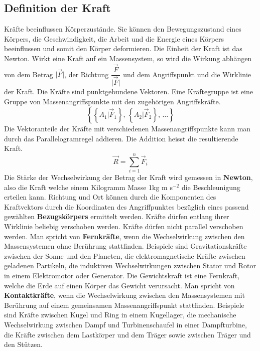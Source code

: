 \subsection{Definition der Kraft}
Kräfte beeinflussen Körperzustände. Sie können den Bewegungszustand eines Körpers, die Geschwindigkeit, die Arbeit und die Energie eines Körpers beeinflussen und somit den Körper deformieren. Die Einheit der Kraft ist das Newton.
\newline\newline
Wirkt eine Kraft auf ein Massensystem, so wird die Wirkung abhängen von dem Betrag $\Big\vert \overrightarrow{F}\Big\vert$, der Richtung $\dfrac{\overrightarrow{F}}{\Big\vert\overrightarrow{F}\Big\vert}$ und dem Angriffspunkt und die Wirklinie der Kraft. Die Kräfte sind punktgebundene Vektoren. Eine Kräftegruppe ist eine Gruppe von Massenangriffspunkte mit den zugehörigen Angriffskräfte.
\begin{equation}
\boxed{\left\{\left\{A_1 | \overrightarrow{F}_1\right\}, \,\left\{A_2 | \overrightarrow{F}_2\right\},\,\dotso\right\}}
\end{equation}
Die Vektoranteile der Kräfte mit verschiedenen Massenangriffspunkte kann man durch das Parallelogramregel addieren. Die Addition heisst die resultierende Kraft.
\begin{equation}
\boxed{\overrightarrow{R}=\displaystyle \sum_{i=1}^n\overrightarrow{F}_i}
\end{equation}
Die Stärke der Wechselwirkung der Betrag der Kraft wird gemessen in \textbf{Newton}, also die Kraft welche einem Kilogramm Masse 1kg m s$^{-2}$ die Beschleunigung erteilen kann. Richtung und Ort können durch die Komponenten des Kraftvektors durch die Koordinaten des Angriffpunktes bezüglich eines passend gewählten \textbf{Bezugskörpers} ermittelt werden.
\newline\newline
Kräfte dürfen entlang ihrer Wirklinie beliebig verschoben werden. Kräfte dürfen nicht parallel verschoben werden. 
\newline\newline
Man spricht von \textbf{Fernkräfte}, wenn die Wechselwirkung zwischen den Massensystemen ohne Berührung stattfinden. Beispiele sind Gravitationskräfte zwischen der Sonne und den Planeten, die elektromagnetische Kräfte zwischen geladenen Partikeln, die induktiven Wechselwirkungen zwischen Stator und Rotor in einem Elektromotor oder Generator. Die Gewichtskraft ist eine Fernkraft, welche die Erde auf einen Körper das Gewicht verursacht.
\newline\newline
Man spricht von \textbf{Kontaktkräfte}, wenn die Wechselwirkung zwischen den Massensystemen mit Berührung auf einem gemeinsamen Massenangriffspunkt stattfinden. Beispiele sind Kräfte zwischen Kugel und Ring in einem Kugellager, die mechanische Wechselwirkung zwischen Dampf und Turbinenschaufel in einer Dampfturbine, die Kräfte zwischen dem Lastkörper und dem Träger sowie zwischen Träger und den Stützen. 
